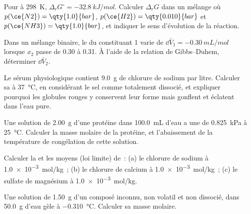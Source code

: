 \begin{exercise}[$\star$]\label{exo:b2:chemical-potential:4}
Pour  à \qty{298}{K}, $\Delta_r G^\circ =
\qty{-32.8}{kJ/mol}$. Calculer $\Delta_r G$ dans un mélange où
$p(\ce{N2}) = \qty{1.0}{bar}$, $p(\ce{H2}) = \qty{0.010}{bar}$ et
$p(\ce{NH3}) = \qty{1.0}{bar}$, et indiquer le sens d'évolution de la réaction.
\end{exercise}

\begin{exercise}[$\star\star$]\label{exo:b2:chemical-potential:5}
Dans un mélange binaire, le  du constituant 1 varie de
$\dd\bar V_1 = \qty{-0.30}{mL/mol}$ lorsque $x_2$ passe de 0.30 à 0.31. À l'aide de
la relation de Gibbs--Duhem, déterminer $\dd\bar V_2$.
\end{exercise}

\begin{exercise}[$\star\star$]\label{exo:b2:chemical-potential:6}
Le sérum physiologique contient \qty{9.0}{g} de chlorure de sodium par litre.
Calculer sa  à \qty{37}{\celsius}, en considérant le sel comme totalement
dissocié, et expliquer pourquoi les globules rouges y conservent leur forme mais gonflent
et éclatent dans l'eau pure.
\end{exercise}

\begin{exercise}[$\star\star$]\label{exo:b2:chemical-potential:7}
Une solution de \qty{2.00}{g} d'une protéine dans \qty{100.0}{mL} d'eau a une
 de \qty{0.825}{kPa} à \qty{25}{\celsius}. Calculer la masse
molaire de la protéine, et l'abaissement de la température de congélation de cette solution.
\end{exercise}

\begin{exercise}[$\star\star$]\label{exo:b2:chemical-potential:8}
Calculer la  et les  moyens (loi limite)
de~: (a) le chlorure de sodium à \qty{1.0e-3}{mol/kg}~; (b) le chlorure de calcium
à \qty{1.0e-3}{mol/kg}~; (c) le sulfate de magnésium à \qty{1.0e-3}{mol/kg}.
\end{exercise}

\begin{exercise}[$\star\star$]\label{exo:b2:chemical-potential:9}
Une solution de \qty{1.50}{g} d'un composé inconnu, non volatil et non dissocié,
dans \qty{50.0}{g} d'eau gèle à \qty{-0.310}{\celsius}. Calculer
sa masse molaire.
\end{exercise}

